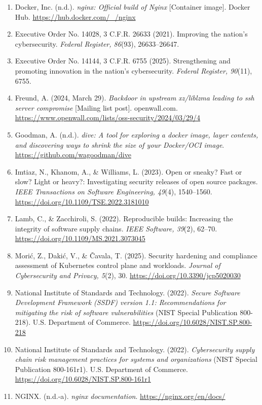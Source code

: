 \documentclass[10pt,letterpaper,twocolumn]{article}
\begin{document}
{\begin{enumerate}[label=\arabic*.,leftmargin=*,itemsep=1pt,parsep=0pt,topsep=2pt]
\item Docker, Inc. (n.d.). \textit{nginx: Official build of Nginx} [Container image]. Docker Hub. \url{https://hub.docker.com/_/nginx}
\item Executive Order No. 14028, 3 C.F.R. 26633 (2021). Improving the nation's cybersecurity. \textit{Federal Register, 86}(93), 26633--26647.
\item Executive Order No. 14144, 3 C.F.R. 6755 (2025). Strengthening and promoting innovation in the nation's cybersecurity. \textit{Federal Register, 90}(11), 6755.
\item Freund, A. (2024, March 29). \textit{Backdoor in upstream xz/liblzma leading to ssh server compromise} [Mailing list post]. openwall.com. \url{https://www.openwall.com/lists/oss-security/2024/03/29/4}
\item Goodman, A. (n.d.). \textit{dive: A tool for exploring a docker image, layer contents, and discovering ways to shrink the size of your Docker/OCI image}. \url{https://github.com/wagoodman/dive}
\item Imtiaz, N., Khanom, A., \& Williams, L. (2023). Open or sneaky? Fast or slow? Light or heavy?: Investigating security releases of open source packages. \textit{IEEE Transactions on Software Engineering, 49}(4), 1540--1560. \url{https://doi.org/10.1109/TSE.2022.3181010}
\item Lamb, C., \& Zacchiroli, S. (2022). Reproducible builds: Increasing the integrity of software supply chains. \textit{IEEE Software, 39}(2), 62--70. \url{https://doi.org/10.1109/MS.2021.3073045}
\item Morić, Z., Dakić, V., \& Čavala, T. (2025). Security hardening and compliance assessment of Kubernetes control plane and workloads. \textit{Journal of Cybersecurity and Privacy, 5}(2), 30. \url{https://doi.org/10.3390/jcp5020030}
\item National Institute of Standards and Technology. (2022). \textit{Secure Software Development Framework (SSDF) version 1.1: Recommendations for mitigating the risk of software vulnerabilities} (NIST Special Publication 800-218). U.S. Department of Commerce. \url{https://doi.org/10.6028/NIST.SP.800-218}
\item National Institute of Standards and Technology. (2022). \textit{Cybersecurity supply chain risk management practices for systems and organizations} (NIST Special Publication 800-161r1). U.S. Department of Commerce. \url{https://doi.org/10.6028/NIST.SP.800-161r1}
\item NGINX. (n.d.-a). \textit{nginx documentation}. \url{https://nginx.org/en/docs/}

\end{enumerate}}
\end{document}
